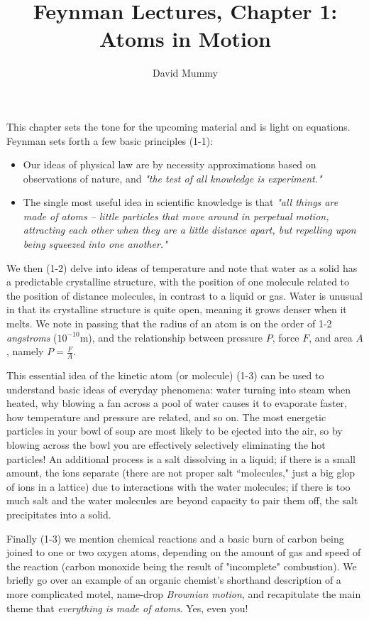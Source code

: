 \documentclass[10pt,letterpaper]{article}
\author{David Mummy}
\title{Feynman Lectures, Chapter 1: Atoms in Motion}
\begin{document}
\maketitle
This chapter sets the tone for the upcoming material and is light on equations. Feynman sets forth a few basic principles (1-1): 
\begin{itemize}
\item Our ideas of physical law are by necessity approximations based on observations of nature, and \textit{"the test of all knowledge is experiment."}
\item The single most useful idea in scientific knowledge is that \textit{"all things are made of atoms -- little particles that move around in perpetual motion, attracting each other when they are a little distance apart, but repelling upon being squeezed into one another."}
\end{itemize}
We then (1-2) delve into ideas of temperature and note that water as a solid has a predictable crystalline structure, with the position of one molecule related to the position of distance molecules, in contrast to a liquid or gas. Water is unusual in that its crystalline structure is quite open, meaning it grows denser when it melts. We note in passing that the radius of an atom is on the order of 1-2 \textit{angstroms} ($10^{-10}$m), and the relationship between pressure $P$, force $F$, and area $A$, namely $P=\frac{F}{A}$.

This essential  idea of the kinetic atom (or molecule) (1-3) can be used to understand basic ideas of everyday phenomena: water turning into steam when heated, why blowing a fan across a pool of water causes it to evaporate faster, how temperature and pressure are related, and so on. The most energetic particles in your bowl of soup are most likely to be ejected into the air, so by blowing across the bowl you are effectively selectively eliminating the hot particles! An additional process is a salt dissolving in a liquid; if there is a small amount, the ions separate (there are not proper salt ``molecules," just a big glop of ions in a lattice) due to interactions with the water molecules; if there is too much salt and the water molecules are beyond capacity to pair them off, the salt precipitates into a solid. 

Finally (1-3) we mention chemical reactions and a basic burn of carbon being joined to one or two oxygen atoms, depending on the amount of gas and speed of the reaction (carbon monoxide being the result of "incomplete" combustion). We briefly go over an example of an organic chemist's shorthand description of a more complicated motel, name-drop \textit{Brownian motion}, and recapitulate the main theme that \textit{everything is made of atoms}. Yes, even you! 
\end{document}
